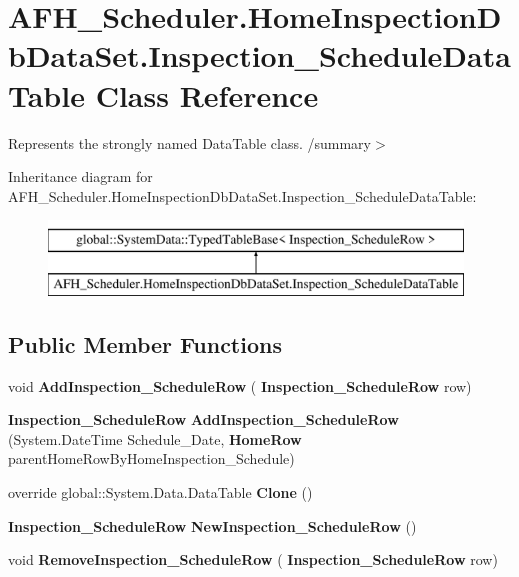 \section{A\+F\+H\+\_\+\+Scheduler.\+Home\+Inspection\+Db\+Data\+Set.\+Inspection\+\_\+\+Schedule\+Data\+Table Class Reference}
\label{class_a_f_h___scheduler_1_1_home_inspection_db_data_set_1_1_inspection___schedule_data_table}


Represents the strongly named Data\+Table class. /summary$>$  


Inheritance diagram for A\+F\+H\+\_\+\+Scheduler.\+Home\+Inspection\+Db\+Data\+Set.\+Inspection\+\_\+\+Schedule\+Data\+Table\+:\begin{figure}[H]
\begin{center}
\leavevmode
\includegraphics[height=2.000000cm]{class_a_f_h___scheduler_1_1_home_inspection_db_data_set_1_1_inspection___schedule_data_table}
\end{center}
\end{figure}
\subsection*{Public Member Functions}
\begin{DoxyCompactItemize}
\item 
\mbox{\label{class_a_f_h___scheduler_1_1_home_inspection_db_data_set_1_1_inspection___schedule_data_table_a12f7d88b93a387ed42da264910e3a27c}} 
void {\bfseries Add\+Inspection\+\_\+\+Schedule\+Row} (\textbf{ Inspection\+\_\+\+Schedule\+Row} row)
\item 
\mbox{\label{class_a_f_h___scheduler_1_1_home_inspection_db_data_set_1_1_inspection___schedule_data_table_a3a0d7f91e3b32f15c8f5f564b7a4acea}} 
\textbf{ Inspection\+\_\+\+Schedule\+Row} {\bfseries Add\+Inspection\+\_\+\+Schedule\+Row} (System.\+Date\+Time Schedule\+\_\+\+Date, \textbf{ Home\+Row} parent\+Home\+Row\+By\+Home\+Inspection\+\_\+\+Schedule)
\item 
\mbox{\label{class_a_f_h___scheduler_1_1_home_inspection_db_data_set_1_1_inspection___schedule_data_table_a85eb3ee396ad69781352addbb529f251}} 
override global\+::\+System.\+Data.\+Data\+Table {\bfseries Clone} ()
\item 
\mbox{\label{class_a_f_h___scheduler_1_1_home_inspection_db_data_set_1_1_inspection___schedule_data_table_adcd27ed3e70212611a7243f44a70fd94}} 
\textbf{ Inspection\+\_\+\+Schedule\+Row} {\bfseries New\+Inspection\+\_\+\+Schedule\+Row} ()
\item 
\mbox{\label{class_a_f_h___scheduler_1_1_home_inspection_db_data_set_1_1_inspection___schedule_data_table_a4f4a0121d97f0fec57ce2ae95987693f}} 
void {\bfseries Remove\+Inspection\+\_\+\+Schedule\+Row} (\textbf{ Inspection\+\_\+\+Schedule\+Row} row)
\end{DoxyCompactItemize}
